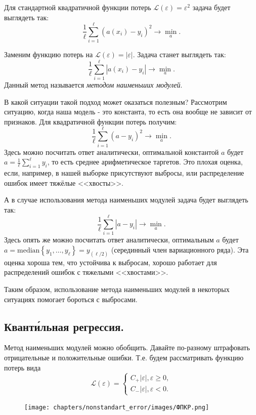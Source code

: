 Для стандартной квадратичной функции потерь $\mathscr{L}(\varepsilon) = \varepsilon^2$ задача будет выглядеть так:
$$\frac{1}{\ell}\sum\limits_{i=1}^\ell\left(a(x_i) - y_i\right)^2 \longrightarrow \min\limits_{a}.$$

Заменим функцию потерь на $\mathscr{L}(\varepsilon) = |\varepsilon|$.
Задача станет выглядеть так:
$$\frac{1}{\ell}\sum\limits_{i=1}^\ell\left|a(x_i) - y_i\right| \longrightarrow \min\limits_{a}.$$
Данный метод называется \textit{методом наименьших модулей}.

В какой ситуации такой подход может оказаться полезным? Рассмотрим ситуацию,  когда наша модель - это константа, то есть она вообще не зависит от признаков. Для квадратичной функции потерь получим:
$$\frac{1}{\ell}\sum\limits_{i=1}^\ell\left(a - y_i\right)^2 \longrightarrow \min\limits_{a}.$$
Здесь можно посчитать ответ аналитически, оптимальной константой $a$ будет $a = \frac{1}{\ell}\sum\limits_{i=1}^\ell y_i$, то есть среднее арифметическое таргетов. Это плохая оценка, если, например, в нашей выборке присутствуют выбросы, или распределение ошибок имеет тяжёлые <<хвосты>>.

А в случае использования метода наименьших модулей задача будет выглядеть так:
$$\frac{1}{\ell}\sum\limits_{i=1}^\ell\left|a - y_i\right| \longrightarrow \min\limits_{a}.$$
Здесь опять же можно посчитать ответ аналитически, оптимальным $a$ будет $a = \text{median}\left\{ y_1, \dotsc, y_\ell \right\} = y_{(\ell / 2)}$ (серединный член вариационного ряда). Эта оценка хороша тем, что устойчива к выбросам, хорошо работает для распределений ошибок с тяжелыми <<хвостами>>.

Таким образом, использование метода наименьших модулей в некоторых ситуациях помогает бороться с выбросами.

\subsection*{Квант\'{и}льная регрессия.}

Метод наименьших модулей можно обобщить. Давайте по-разному штрафовать отрицательные и положительные ошибки. Т.е. будем рассматривать функцию потерь вида
$$\mathscr{L}(\varepsilon) = \begin{cases}
    C_+|\varepsilon|, \varepsilon \geq 0,\\
    C_-|\varepsilon|, \varepsilon < 0.
\end{cases}$$

\begin{figure}[h]
    \centering
    \texttt{[image: chapters/nonstandart\_error/images/ФПКР.png]}
\end{figure}


